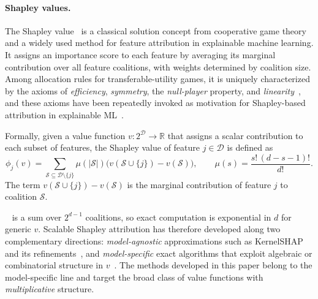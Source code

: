 \documentclass{article}
\newcommand{\cD}{\mathcal{D}}
\newcommand{\cS}{\mathcal{S}}
\begin{document}
\paragraph{Shapley values.}
The Shapley value~\citep{shapley} is a classical solution concept from cooperative game theory and a widely used method for feature attribution in explainable machine learning.
It assigns an importance score to each feature by averaging its marginal contribution over all feature coalitions, with weights determined by coalition size.
Among allocation rules for transferable-utility games, it is uniquely characterized by the axioms of \emph{efficiency}, \emph{symmetry}, the \emph{null-player} property, and \emph{linearity}~\citep{shapley,weber1988probabilistic}, and these axioms have been repeatedly invoked as motivation for Shapley-based attribution in explainable ML~\citep{shap,shapiq,polyshap,treeshap,gpshap,rkhs_shap,many_sv}.

Formally, given a value function $v : 2^{\cD} \to \mathbb{R}$ that assigns a scalar contribution to each subset of features,
the Shapley value of feature $j \in \cD$ is defined as
\begin{equation}
\label{eq:shapley_def}
\phi_j(v)
=
\sum_{\cS \subseteq \cD \setminus \{j\}}
\mu(|\cS|)
\bigl( v(\cS \cup \{j\}) - v(\cS) \bigr),
\qquad
\mu(s) = \frac{s!\,(d-s-1)!}{d!}.
\end{equation}
The term $v(\cS \cup \{j\}) - v(\cS)$ is the marginal contribution of feature $j$ to coalition $\cS$.%

~ is a sum over $2^{d-1}$ coalitions, so exact computation is exponential in $d$ for generic $v$.
Scalable Shapley attribution has therefore developed along two complementary directions: \emph{model-agnostic} approximations such as KernelSHAP and its refinements~\citep{shap,shapiq,polyshap,lime}, and \emph{model-specific} exact algorithms that exploit algebraic or combinatorial structure in $v$~\citep{treeshap,linear_treeshap,fourier_treeshap,fast_tree_shap,q-shap,pkex_shapley,fgpx_shapley,rkhs_shap,gpshap}.
The methods developed in this paper belong to the model-specific line and target the broad class of value functions with \emph{multiplicative} structure.
\end{document}

